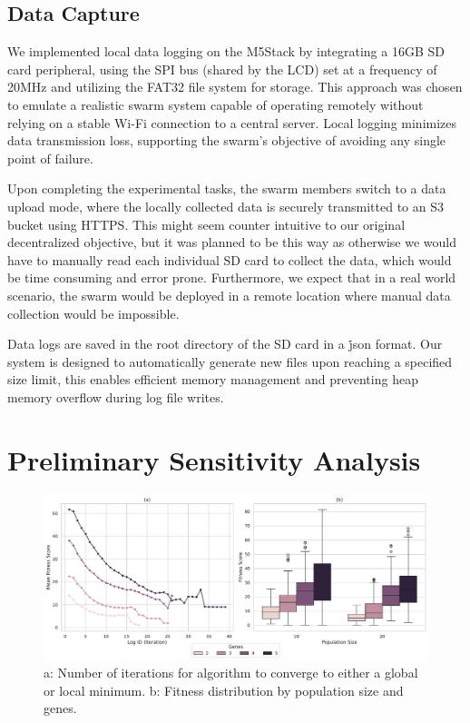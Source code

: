 \documentclass[conference]{IEEEtran}
\begin{document}
\subsection{Data Capture}
We implemented local data logging on the M5Stack by integrating a 16GB SD card peripheral, using the SPI bus (shared by the LCD) set at a frequency of 20MHz and utilizing the FAT32 file system for storage. This approach was chosen to emulate a realistic swarm system capable of operating remotely without relying on a stable Wi-Fi connection to a central server. Local logging minimizes data transmission loss, supporting the swarm's objective of avoiding any single point of failure. 

Upon completing the experimental tasks, the swarm members switch to a data upload mode, where the locally collected data is securely transmitted to an S3 bucket using HTTPS. This might seem counter intuitive to our original decentralized objective, but it was planned to be this way as otherwise we would have to manually read each individual SD card to collect the data, which would be time consuming and error prone. Furthermore, we expect that in a real world scenario, the swarm would be deployed in a remote location where manual data collection would be impossible.

Data logs are saved in the root directory of the SD card in a \.json format. Our system is designed to automatically generate new files upon reaching a specified size limit, this enables efficient memory management and preventing heap memory overflow during log file writes.


\newpage
\section{Preliminary Sensitivity Analysis}

\begin{figure}[h]
    \centering
    \includegraphics[width=1\textwidth]{ga_prelim_analysis.pdf}
    \caption{a: Number of iterations for algorithm to converge to either a global or local minimum. b: Fitness distribution by population size and genes.}
    \label{fig:ga_prelim_analysis}
\end{figure}
\end{document}

